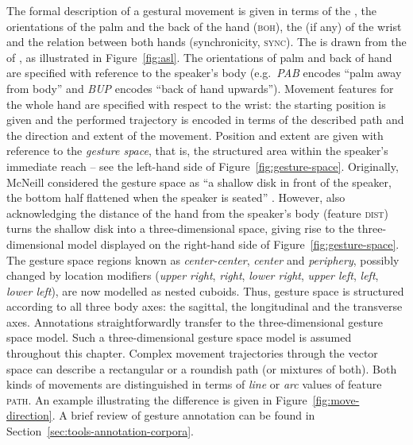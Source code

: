 \documentclass[output=paper
                ,modfonts
                ,nonflat
	        ,collection
	        ,collectionchapter
	        ,collectiontoclongg
 	        ,biblatex
                ,babelshorthands
                ,newtxmath
                ,draftmode
                ,colorlinks, citecolor=brown
]{./langsci/langscibook}
\begin{document}
The formal description of a gestural movement is given in terms of the ,  the orientations of the palm  and the back of the hand (\textsc{boh}),  the  (if any) of the wrist  and the relation between both hands (synchronicity, \textsc{sync}). 
%
The  is drawn from the  of , as illustrated in Figure~\ref{fig:asl}.
%
The orientations  of palm and back of hand are specified with reference to the speaker's body (e.g.\ \textit{PAB} encodes \enquote{palm away from body} and \textit{BUP} encodes \enquote{back of hand upwards}). 
%
Movement features for the whole hand are specified with respect to the wrist: the starting position  is given and the performed trajectory is encoded in terms of the described path  and the direction  and extent  of the movement.
%
Position and extent are given with reference to the \emph{gesture space}, that is, the structured area within the speaker's immediate reach \citep[--89]{McNeill:1992} -- see the left-hand side of Figure~\ref{fig:gesture-space}. 
%
Originally, McNeill considered the gesture space as \enquote{a shallow disk in front of the speaker, the bottom half flattened when the speaker is seated} \citep[]{McNeill:1992}. 
%
However, also acknowledging the distance of the hand from the speaker's body (feature \textsc{dist}) turns the shallow disk into a three-dimensional space, giving rise to the three-dimensional model displayed on the right-hand side of Figure~\ref{fig:gesture-space}.
%
The gesture space regions known as \emph{center-center}, \emph{center} and \emph{periphery}, possibly changed by location modifiers (\emph{upper right}, \emph{right}, \emph{lower right}, \emph{upper left}, \emph{left}, \emph{lower left}), are now modelled as nested cuboids. 
%
Thus, gesture space is structured according to all three body axes: the sagittal, the longitudinal and the transverse axes.
%
Annotations straightforwardly transfer to the three-dimensional gesture space model.
%
Such a three-dimensional gesture space model is assumed throughout this chapter.
%
Complex movement trajectories through the vector space can describe a rectangular or a roundish path (or mixtures of both). 
%
Both kinds of movements are distinguished in terms of \textit{line}  or \textit{arc}  values of feature \textsc{path}.
%
An example illustrating the difference is given in Figure~\ref{fig:move-direction}.
%
A brief review of gesture annotation can be found in Section~\ref{sec:tools-annotation-corpora}.
%
\end{document}
